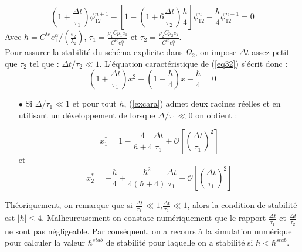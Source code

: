 \documentclass[11pt,a4paper]{scrartcl}%
\newcommand{\va}[1]{\left\lvert#1\right\rvert}%
\begin{document}
\begin{itemize}
		\begin{equation}\label{eq32}
		\left(1 +\frac{\Delta t}{\tau_1}\right)\phi_{12}^{n+1} - \left[1-\left(1 + 6\frac{\Delta t}{\tau_2}\right)\frac{\hbar}{4} \right]\phi_{12}^n - \frac{\hbar}{4}\phi_{12}^{n-1} = 0
		\end{equation}
		Avec $\hbar = C^{te}e_1^{\alpha}/(\frac{e_2}{\lambda_2})$, $\tau_1 = \frac{\rho_1C{p_1}e_1 }{C^{te}e_1^{\alpha}}$ et $\tau_2 = \frac{\rho_2C{p_2}e_2 }{C^{te}e_1^{\alpha}}$.\\
		Pour assurer la stabilité du schéma explicite dans $\Omega_2$, on impose $\Delta t$ assez petit que $\tau_2$ tel que : $\Delta t/\tau_2 \ll 1$. L'équation caractéristique de (\ref{eq32}) s'écrit donc :
		\begin{equation}\label{excara}
		\left(1 +\frac{\Delta t}{\tau_1}\right)x^2 - \left(1-\frac{\hbar}{4}  \right)x - \frac{\hbar}{4} = 0 
		\end{equation} 
		\begin{itemize}
			\item [$\bullet$] Si  $\Delta/\tau_1  \ll 1$ et pour tout $h$, (\ref{excara}) admet deux racines réelles et en utilisant un développement de  lorsque $\Delta/\tau_1  \ll 0$ on obtient :
			
			\[
			x_1^* = 1 - \frac{4}{\hbar+4}\frac{\Delta t}{\tau_1} + \mathcal{O}\left[\left(\frac{\Delta t}{\tau_1}\right)^2\right]
			\] 
			et 
			\[
			x_2^* = -\frac{\hbar}{4} + \frac{\hbar^2}{4(\hbar+4)}\frac{\Delta t}{\tau_1} + \mathcal{O}\left[\left(\frac{\Delta t}{\tau_1}\right)^2\right]
			\]
			
		\end{itemize}
	\end{itemize}
	Théoriquement, on remarque que si $\frac{\Delta t}{\tau_1} \ll 1$,$\frac{\Delta t}{\tau_2} \ll 1$, alors la condition de stabilité est $\va{\hbar} \leq 4$. Malheureusement on constate numériquement que le rapport $\frac{\Delta t}{\tau_1}$ et $\frac{\Delta t}{\tau_2}$ ne sont pas négligeable. Par conséquent, on a recours à la simulation numérique pour calculer la valeur $\hbar^{stab}$ de stabilité pour laquelle on a stabilité si $\hbar < \hbar^{stab}$.    
\end{document}
